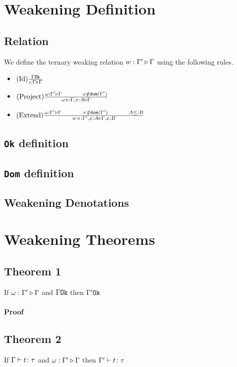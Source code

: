\documentclass{report}
\begin{document}
    \section{Weakening Definition}
    \subsection{Relation}
    We define the ternary weaking relation $w : \Gamma' \triangleright \Gamma$ using the following rules.


    \begin{itemize}
        \item $(\text{Id}) \frac{\Gamma \texttt{Ok}}{\iota : \Gamma \triangleright \Gamma}$
        \item $\treerule{Project}{\wrel{\w}{\G'}{\G}\s\s x \notin \dom{\G'}}{\wrel{\w \pi}{\G, x: A}{\G}}$
        \item $\treerule{Extend}{\wrel{\w}{\G'}{\G}\s\s\x \notin \dom{\G'}\s\s A \subtype B}{\wrel{w \x}{\G', x: A}{\G, x: B}}$
    \end{itemize}

    \subsection{\texttt{Ok} definition}

    \subsection{\texttt{Dom} definition}

    \subsection{Weakening Denotations}
    \section{Weakening Theorems}
    \subsection{Theorem 1}
    If $\omega : \Gamma' \triangleright \Gamma$ and $\Gamma \texttt{Ok}$ then $\Gamma' \texttt{Ok}$
    \paragraph{Proof}
    \subsection{Theorem 2}
    If $\Gamma \vdash t \colon \tau$ and $\omega : \Gamma' \triangleright \Gamma$ then $\Gamma' \vdash t \colon \tau$
\end{document}
